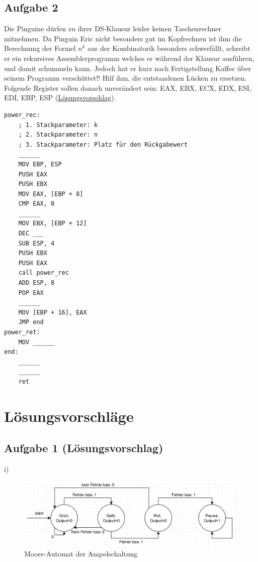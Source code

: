 \documentclass{article}
\begin{document}
\subsection{Aufgabe 2}
Die Pinguine dürfen zu ihrer DS-Klausur leider keinen Taschenrechner mitnehmen. Da Pinguin Eric nicht besonders gut im Kopfrechnen ist ihm die Berechnung der Formel $n^k$ aus der Kombinatorik besonders schwerfällt, schreibt er ein rekursives Assemblerprogramm welches er während der Klausur ausführen, und damit schummeln kann. Jedoch hat er kurz nach Fertigstellung Kaffee über seinem Programm verschüttet!!
Hilf ihm, die entstandenen Lücken zu ersetzen.
Folgende Register sollen danach unverändert sein:
EAX, EBX, ECX, EDX, ESI, EDI, EBP, ESP (\hyperref[sec:lsg02]{Lösungsvorschlag}).
\begin{verbatim}
power_rec:
    ; 1. Stackparameter: k
    ; 2. Stackparameter: n
    ; 3. Stackparameter: Platz für den Rückgabewert
    ______
    MOV EBP, ESP
    PUSH EAX
    PUSH EBX
    MOV EAX, [EBP + 8]
    CMP EAX, 0
    ______
    MOV EBX, [EBP + 12]
    DEC ___
    SUB ESP, 4
    PUSH EBX
    PUSH EAX
    call power_rec
    ADD ESP, 8
    POP EAX
    ______
    MOV [EBP + 16], EAX
    JMP end
power_ret:
    MOV ______
end:
    ______
    ______
    ret
\end{verbatim}

\newpage

\section{Lösungsvorschläge}

\subsection{Aufgabe 1 (Lösungsvorschlag)}
i)
\begin{figure}[H]
\centering
\includegraphics[scale=0.45]{automat.png}
\caption{Moore-Automat der Ampelschaltung}
\end{figure}
\end{document}
